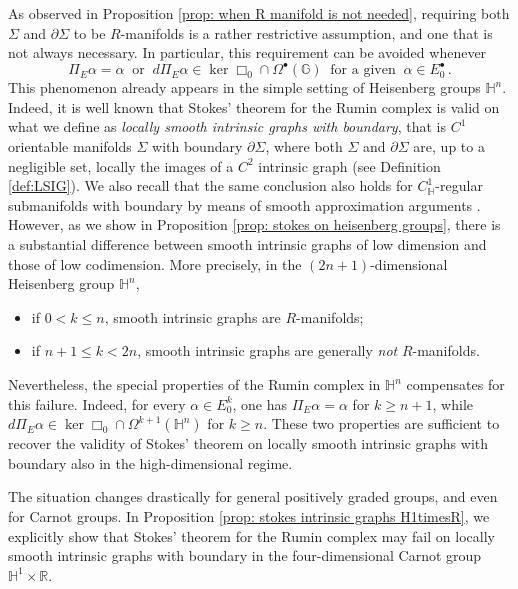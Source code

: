 \documentclass[dvipsnames]{amsart}
\theoremstyle{definition}
\theoremstyle{definition}
\numberwithin{equation}{section}
\newcommand{\G}{\mathbb{G}}
\renewcommand{\H}{\mathbb{H}}
\begin{document}
As observed in Proposition \ref{prop: when R manifold is not needed}, requiring both \(\Sigma\) and \(\partial\Sigma\) to be \(R\)-manifolds is a rather restrictive assumption, and one that is not always necessary. In particular, this requirement can be avoided whenever
\[
    \Pi_E\alpha=\alpha
    \ \text{ or }\
    d\Pi_E\alpha\in\ker\Box_0\cap\Omega^\bullet(\G)\ \text{ for a given }\ \alpha\in E_0^\bullet\,.
\]
This phenomenon already appears in the simple setting of Heisenberg groups \(\mathbb H^n\). Indeed, it is well known that Stokes' theorem for the Rumin complex is valid on what we define as \textit{locally smooth intrinsic graphs with boundary}, that is $C^1$ orientable manifolds $\Sigma$ with boundary $\partial\Sigma$, where both $\Sigma$ and $\partial\Sigma$ are, up to a negligible set, locally the images of a $C^2$ intrinsic graph (see Definition \ref{def:LSIG}). We also recall that the same conclusion also holds for $C^1_{\mathbb H}$-regular submanifolds with boundary by means of smooth approximation arguments \cite{StokesFranchi,dimarco2025submanifoldsboundarysubriemannianheisenberg}. However, as we show in Proposition \ref{prop: stokes on heisenberg groups}, there is a substantial difference between smooth intrinsic graphs of low dimension and those of low codimension. More precisely, in the \((2n+1)\)-dimensional Heisenberg group \(\mathbb H^n\),
\begin{itemize}
    \item if \(0<k\le n\), smooth intrinsic graphs are \(R\)-manifolds;
    \item if \(n+1\le k<2n\), smooth intrinsic graphs are generally \textit{not} \(R\)-manifolds.
\end{itemize}
Nevertheless, the special properties of the Rumin complex in $\H^n$ compensates for this failure. Indeed, for every \(\alpha\in E_0^k\), one has $\Pi_E\alpha=\alpha$ for $k\ge n+1$, while $
    d\Pi_E\alpha
    \in
    \ker\Box_0\cap\Omega^{k+1}(\mathbb H^n)$ for $k\ge n$.
These two properties are sufficient to recover the validity of Stokes' theorem on locally smooth intrinsic graphs with boundary also in the high-dimensional regime.

The situation changes drastically for general positively graded groups, and even for Carnot groups. In Proposition \ref{prop: stokes intrinsic graphs H1timesR}, we explicitly show that Stokes' theorem for the Rumin complex may fail on locally smooth intrinsic graphs with boundary in the four-dimensional Carnot group \(\mathbb H^1\times\mathbb R\).
\end{document}
